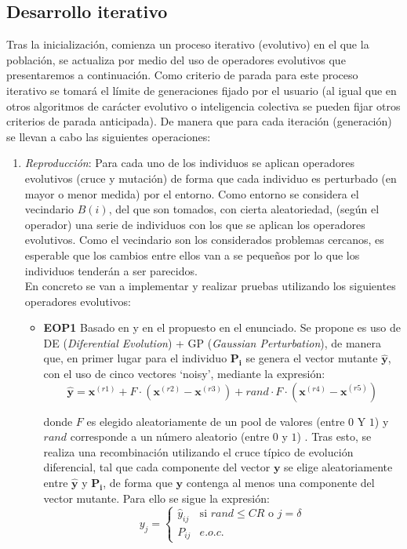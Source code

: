 \subsection{Desarrollo iterativo}

Tras la inicialización, comienza un proceso iterativo (evolutivo) en el que la población, se actualiza por medio del uso de operadores evolutivos que presentaremos a continuación. Como criterio de parada para este proceso iterativo se tomará el límite de generaciones fijado por el usuario (al igual que en otros algoritmos de carácter evolutivo o inteligencia colectiva se pueden fijar otros criterios de parada anticipada). De manera que para cada iteración (generación) se llevan a cabo las siguientes operaciones:\\

\begin{enumerate}
    \item \textit{Reproducción}: Para cada uno de los individuos se aplican operadores evolutivos (cruce y mutación) de forma que cada individuo es perturbado (en mayor o menor medida) por el entorno. Como entorno se considera el vecindario $B(i)$, del que son tomados, con cierta aleatoriedad, (según el operador) una serie de individuos con los que se aplican los operadores evolutivos. Como el vecindario son los considerados problemas cercanos, es esperable que los cambios entre ellos van a se pequeños por lo que los individuos tenderán a ser parecidos.\\
    
    En concreto se van a implementar y realizar pruebas utilizando los siguientes operadores evolutivos:\\

    \begin{itemize}
        \item  \textbf{EOP1} Basado en \cite{Li2014} y en el propuesto en el enunciado. Se propone es uso de DE (\textit{Diferential Evolution}) + GP (\textit{Gaussian Perturbation}), de manera que, en primer lugar para  el individuo $\boldsymbol{P_i}$ se genera el vector mutante $\boldsymbol{\hat{y}}$, con el uso de cinco vectores `noisy', mediante la expresión:  $$\boldsymbol{\hat{y}}=\boldsymbol{x}^{(r1)} + F \cdot (\boldsymbol{x}^{(r2)}- \boldsymbol{x}^{(r3)}) + rand \cdot  F \cdot (\boldsymbol{x}^{(r4)}- \boldsymbol{x}^{(r5)}) $$
        
        donde $F$ es elegido aleatoriamente de un pool de valores (entre $0$ Y $1$) y $rand$ corresponde a un número aleatorio (entre $0$ y $1$) . Tras esto, se realiza una recombinación utilizando el cruce típico de evolución diferencial, tal que cada componente del vector $\boldsymbol{y}$ se elige aleatoriamente entre $\boldsymbol{\hat{y}}$  y $\boldsymbol{P_i}$, de forma que $\boldsymbol{y}$ contenga al menos una componente del vector mutante. Para ello se sigue la expresión: $$ y_j = \left\lbrace \begin{array}{cl}
            \hat{y}_{ij} & \textrm{si } rand \leq \textit{CR} \textrm{ o } j = \delta\\
             P_{ij} & e.o.c.
        \end{array} \right. $$
        

\end{itemize}
\end{enumerate}
